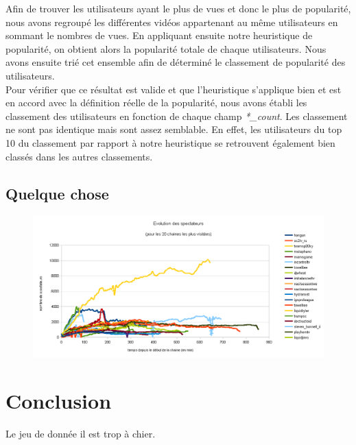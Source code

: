 \documentclass[11pt, a4paper, titlepage]{scrartcl}
\begin{document}
Afin de trouver les utilisateurs ayant le plus de vues et donc le plus de
popularité, nous avons regroupé les différentes vidéos appartenant au même
utilisateurs en sommant le nombres de vues. En appliquant ensuite notre
heuristique de popularité, on obtient alors la popularité totale de chaque
utilisateurs. Nous avons ensuite trié cet ensemble afin de déterminé le
classement de popularité des utilisateurs. \\

Pour vérifier que ce résultat est valide et que l'heuristique s'applique bien
et est en accord avec la définition réelle de la popularité, nous avons établi
les classement des utilisateurs en fonction de chaque champ \textit{*\_count}.
Les classement ne sont pas identique mais sont assez semblable. En effet, les
utilisateurs du top 10 du classement par rapport à notre heuristique se
retrouvent également bien classés dans les autres classements. \\

\subsection{Quelque chose}
\begin{figure}[h]
    \centering
    \includegraphics[width=\textwidth]{images/top_20_view_evolutions}
    \caption{}
\end{figure}


\section{Conclusion}

Le jeu de donnée il est trop à chier.
\end{document}
